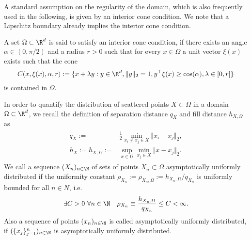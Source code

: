 \documentclass[a4paper, 10pt]{article}
\begin{document}
A standard assumption on the regularity of the domain, which is also frequently used in the following, is given by an interior cone condition.
We note that a Lipschitz boundary already implies the interior cone condition. 
%
\begin{definition}
A set $\Omega \subset \R^d$ is said to satisfy an interior cone condition, if there exists an angle $\alpha \in (0, \pi/2)$ and a radius $r>0$ such that for every $x \in \Omega$ a unit vector $\xi(x)$ exists such that the cone 
\begin{align}
\label{eq:definition_cone}
C(x, \xi(x), \alpha, r) := \{ x + \lambda y: y \in \R^d, \Vert y \Vert_2 = 1, y^\top \xi(x) \geq \cos(\alpha), \lambda \in [0, r] \}
\end{align}
is contained in $\Omega$.
\end{definition}
%

In order to quantify the distribution of scattered points $X \subset \Omega$ in a domain $\Omega \subset \R^d$, 
we recall the definition of separation distance $q_{X}$ and fill distance $h_{X, \Omega}$ as
\begin{align}
\label{eq:fill_sep_dist}
\begin{aligned}
q_{X} :=& \frac{1}{2} \min_{x_i \neq x_j \in X} \Vert x_i - x_j \Vert_2, \\
h_X := h_{X, \Omega} :=& \sup_{x \in \Omega} \min_{x_j \in X} \Vert x - x_j \Vert_2.
\end{aligned}
\end{align}
We call a sequence $(X_n)_{n \in \N}$ of sets of points $X_n \subset \Omega$ asymptotically uniformly distributed if the uniformity constant $\rho_{X_n} := \rho_{X_n, \Omega} := h_{X_n, \Omega} / q_{X_n}$ is uniformly bounded for all $n \in N$, i.e.\
\begin{align}
\label{eq:uniformly_distributed_points}
\exists C>0 ~ \forall n \in \N \quad \rho_{X_n} \equiv \frac{h_{X_n, \Omega}}{q_{X_n}} \leq C < \infty.
\end{align}
%
%
Also a sequence of points $( x_n )_{n \in \N}$ is called asymptotically uniformly distributed, if $( \{x_j\}_{j=1}^n )_{n \in \N}$ is asymptotically uniformly distributed.
\end{document}

